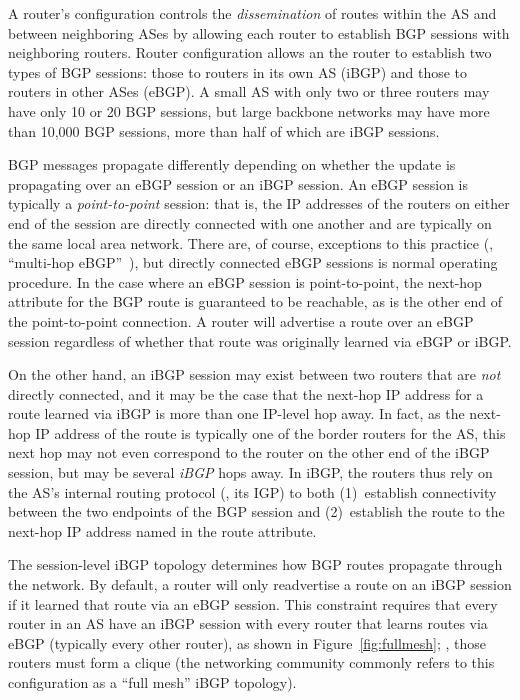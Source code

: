 A router's configuration controls the {\em dissemination} of routes
within the AS and between neighboring ASes by allowing each router to 
establish BGP sessions with neighboring routers.  Router configuration
allows an the router to establish two types of BGP sessions: those to
routers in its own AS (iBGP) and those to routers
in other ASes (eBGP).  A small AS with only two or
three routers may have only 10 or 20 BGP sessions, but large backbone
networks may have more than 10,000 BGP sessions, more than half of
which are iBGP sessions.  

BGP messages propagate differently depending on whether the update
is propagating over an eBGP session or an iBGP session.  An eBGP session
is typically a {\em point-to-point} session: that is, the IP addresses
of the routers on either end of the session are directly connected with
one another and are typically on the same local area network.  There
are, of course, exceptions to this practice (\ie, ``multi-hop
eBGP''~\cite{www-ebgp-multihop}), but directly connected eBGP sessions
is normal operating procedure.  In the case where an eBGP session is
point-to-point, the next-hop attribute for the BGP route is guaranteed
to be reachable, as is the other end of the point-to-point connection.
A router will advertise a route over an eBGP session regardless of
whether that route was originally learned via eBGP or iBGP.

On the other hand, an iBGP session may exist between two routers that
are {\em not} directly connected, and it may be the case that the
next-hop IP address for a route learned via iBGP is more than one
IP-level hop away.  In fact, as the next-hop IP address of the route is
typically one of the border routers for the AS, this next hop may not
even correspond to the router on the other end of the iBGP session, but
may be several {\em iBGP} hops away.  In iBGP, the routers thus rely on
the AS's internal routing protocol (\ie, its IGP) to both (1)~establish
connectivity between the two endpoints of the BGP session and
(2)~establish the route to the next-hop IP address named in the route
attribute.  

The session-level iBGP topology determines how BGP routes propagate
through the network.  By default, a router will only readvertise a route
on an iBGP session if it learned that route via an eBGP session.  This
constraint requires that every router in an AS have an iBGP session with
every router that learns routes via eBGP (typically every other router),
as shown in Figure~\ref{fig:fullmesh}; \ie, those routers must form a
clique (the networking community commonly refers to this configuration
as a ``full mesh'' iBGP topology).

